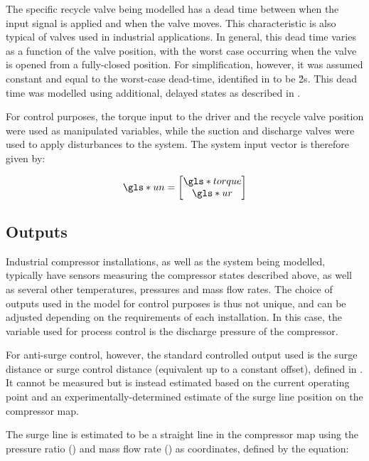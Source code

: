 The specific recycle valve being modelled has a dead time between when the input signal is applied and when the valve moves.
This characteristic is also typical of valves used in industrial applications.
In general, this dead time varies as a function of the valve position, with the worst case occurring when the valve is opened from a fully-closed position.
For simplification, however, it was assumed constant and equal to the worst-case dead-time, identified in \cite{Cortinovis2015} to be \u{2}{s}.
This dead time was modelled using additional, delayed states as described in .

For control purposes, the torque input to the driver and the recycle valve position were used as manipulated variables, while the suction and discharge valves were used to apply disturbances to the system. The system input vector is therefore given by:

\begin{equation}
  \g{un} = \begin{bmatrix} \g{torque} \\ \g{ur} \end{bmatrix}
\end{equation}

\subsection{Outputs}
\label{sec:mod:comp:outputs}

Industrial compressor installations, as well as the system being modelled, typically have sensors measuring the compressor states described above, as well as several other temperatures, pressures and mass flow rates.
The choice of outputs used in the model for control purposes is thus not unique, and can be adjusted depending on the requirements of each installation.
In this case, the variable used for process control is the discharge pressure of the compressor.


For anti-surge control, however, the standard controlled output used is the surge distance or surge control distance (equivalent up to a constant offset), defined in .
It cannot be measured but is instead estimated based on the current operating point and an experimentally-determined estimate of the surge line position on the compressor map.

The surge line is estimated to be a straight line in the compressor map using the pressure ratio () and mass flow rate () as coordinates, defined by the equation:

